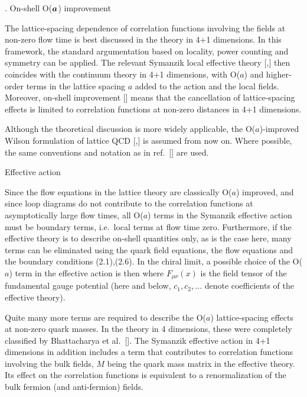 

. On-shell O($\boldsymbol a$) improvement 

The lattice-spacing dependence 
of correlation functions involving the fields at non-zero flow time
is best discussed in the theory in 4+1 dimensions.
In this framework, the standard argumentation 
based on locality, power counting and symmetry
can be applied. 
The relevant Symanzik local effective theory
[\cite{SymanzikSeffI},\cite{SymanzikSeffII}] then
coincides with the continuum theory in 4+1 dimensions,
with O($a$) and higher-order terms in the lattice spacing $a$
added to the action and the local fields.
Moreover, on-shell improvement [\cite{OnShell}]
means that the cancellation of lattice-spacing effects
is limited to correlation functions 
at non-zero distances in 4+1 dimensions.

Although the theoretical discussion is more widely applicable,
the O($a$)-improved Wilson formulation of lattice QCD
[\cite{SW},\cite{SFimp}] is assumed from now on. 
Where possible, the same conventions
and notation as in ref.~[\cite{SFimp}] are used.


 Effective action

Since the flow equations in the lattice theory 
are classically O($a$) improved,
and since loop diagrams do not contribute to the correlation 
functions at asymptotically large flow times,
all O($a$) terms in the Symanzik effective action 
must be boundary terms, i.e.~local terms at flow time zero.
Furthermore, if the effective theory is to describe on-shell
quantities only,
as is the case here, many terms can be eliminated using the 
quark field equations,
the flow equations and the boundary conditions (2.1),(2.6). 
In the chiral limit, a possible choice 
of the O($a$) term in the effective action is then
where $F_{\mu\nu}(x)$ is the field tensor of the fundamental
gauge potential 
(here and below, $c_1,c_2,\ldots$ denote coefficients of the 
effective theory).

Quite many more terms are required to describe the 
O($a$) lattice-spacing effects at non-zero quark masses.
In the theory in 4 dimensions,
these were completely classified
by Bhattacharya et al.~[\cite{ImpNonD}].
The Symanzik effective action 
in 4+1 dimensions in addition includes a term
that contributes to correlation functions involving
the bulk fields, $M$ being the quark mass matrix in the effective theory. 
Its effect on the correlation functions is equivalent
to a renormalization
of the bulk fermion (and anti-fermion) fields. 


